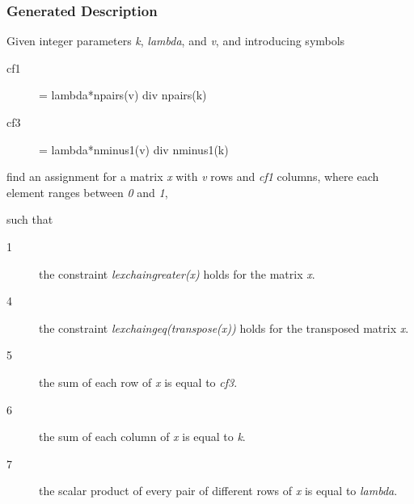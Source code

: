 \begin{frame}
\frametitle{Generated Description}
\begin{mdframed}
Given integer parameters \emph{k}, \emph{lambda}, and \emph{v}, and introducing symbols
\begin{description}
\item[cf1]  = lambda*npairs(v) div npairs(k)
\item[cf3]  = lambda*nminus1(v) div nminus1(k)
\end{description}
find an assignment for a matrix \emph{x} with \emph{v} rows and \emph{cf1} columns, where each element ranges between \emph{0} and \emph{1},

\noindent such that
\begin{description}
\item[1] the constraint \emph{lexchaingreater(x)} holds for the matrix \emph{x}.

\item[4] the constraint \emph{lexchaingeq(transpose(x))} holds for the transposed matrix \emph{x}.

\item[5] the sum of each row of \emph{x} is equal to \emph{cf3}.

\item[6] the sum of each column of \emph{x} is equal to \emph{k}.

\item[7] the scalar product of every pair of different rows of \emph{x} is equal to \emph{lambda}.

\end{description}

\end{mdframed}
\end{frame}

